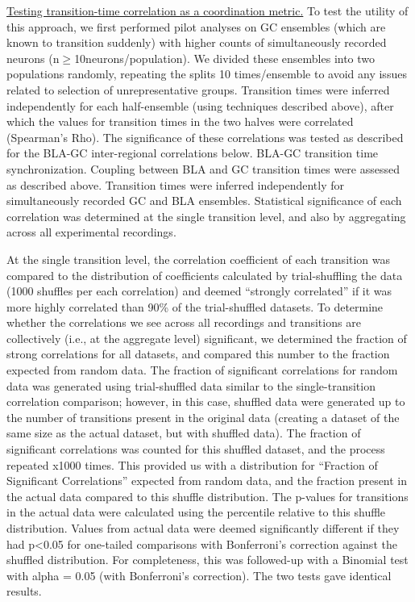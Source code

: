 \begin{refsection}
\noindent\underline{Testing transition-time correlation as a coordination metric.} To test the utility of this approach, we first performed pilot analyses on GC ensembles (which are known to transition suddenly) with higher counts of simultaneously recorded neurons (n\(\ge\)10neurons/population). We divided these ensembles into two populations randomly, repeating the splits 10 times/ensemble to avoid any issues related to selection of unrepresentative groups. Transition times were inferred independently for each half-ensemble (using techniques described above), after which the values for transition times in the two halves were correlated (Spearman’s Rho). The significance of these correlations was tested as described for the BLA-GC inter-regional correlations below.
BLA-GC transition time synchronization. Coupling between BLA and GC transition times were assessed as described above. Transition times were inferred independently for simultaneously recorded GC and BLA ensembles. Statistical significance of each correlation was determined at the single transition level, and also by aggregating across all experimental recordings. 

\noindent At the single transition level, the correlation coefficient of each transition was compared to the distribution of coefficients calculated by trial-shuffling the data (1000 shuffles per each correlation) and deemed “strongly correlated” if it was more highly correlated than 90\% of the trial-shuffled datasets. To determine whether the correlations we see across all recordings and transitions are collectively (i.e., at the aggregate level) significant, we determined the fraction of strong correlations for all datasets, and compared this number to the fraction expected from random data. The fraction of significant correlations for random data was generated using trial-shuffled data similar to the single-transition correlation comparison; however, in this case, shuffled data were generated up to the number of transitions present in the original data (creating a dataset of the same size as the actual dataset, but with shuffled data). The fraction of significant correlations was counted for this shuffled dataset, and the process repeated x1000 times. This provided us with a distribution for “Fraction of Significant Correlations” expected from random data, and the fraction present in the actual data compared to this shuffle distribution. The p-values for transitions in the actual data were calculated using the percentile relative to this shuffle distribution. Values from actual data were deemed significantly different if they had p<0.05 for one-tailed comparisons with Bonferroni’s correction against the shuffled distribution. For completeness, this was followed-up with a Binomial test with alpha = 0.05 (with Bonferroni’s correction). The two tests gave identical results.


\end{refsection}
